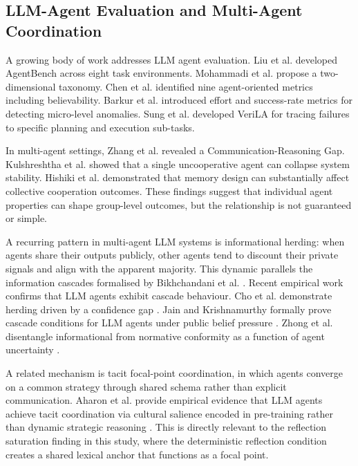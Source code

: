 \documentclass[11pt]{article}
\begin{document}
\subsection{LLM-Agent Evaluation and Multi-Agent Coordination}
A growing body of work addresses LLM agent evaluation. Liu et al. \cite{li2024agentbench} developed AgentBench across eight task environments. Mohammadi et al. \cite{mohammadi2025evaluation} propose a two-dimensional taxonomy. Chen et al. \cite{chen2024evaluating} identified nine agent-oriented metrics including believability. Barkur et al. \cite{barkur2024magenta} introduced effort and success-rate metrics for detecting micro-level anomalies. Sung et al. \cite{sung2025verila} developed VeriLA for tracing failures to specific planning and execution sub-tasks.

In multi-agent settings, Zhang et al. \cite{zhang2026silo} revealed a Communication-Reasoning Gap. Kulshreshtha et al. \cite{kulshreshtha2026defection} showed that a single uncooperative agent can collapse system stability. Hishiki et al. \cite{hishiki2026memory} demonstrated that memory design can substantially affect collective cooperation outcomes. These findings suggest that individual agent properties can shape group-level outcomes, but the relationship is not guaranteed or simple.

A recurring pattern in multi-agent LLM systems is informational herding: when agents share their outputs publicly, other agents tend to discount their private signals and align with the apparent majority. This dynamic parallels the information cascades formalised by Bikhchandani et al. \cite{bikhchandani1992theory}. Recent empirical work confirms that LLM agents exhibit cascade behaviour. Cho et al. demonstrate herding driven by a confidence gap \cite{cho2025herd}. Jain and Krishnamurthy formally prove cascade conditions for LLM agents under public belief pressure \cite{jain2025social}. Zhong et al. disentangle informational from normative conformity as a function of agent uncertainty \cite{zhong2025conformity}.

A related mechanism is tacit focal-point coordination, in which agents converge on a common strategy through shared schema rather than explicit communication. Aharon et al. provide empirical evidence that LLM agents achieve tacit coordination via cultural salience encoded in pre-training rather than dynamic strategic reasoning \cite{aharon2026tacit}. This is directly relevant to the reflection saturation finding in this study, where the deterministic reflection condition creates a shared lexical anchor that functions as a focal point.
\end{document}
